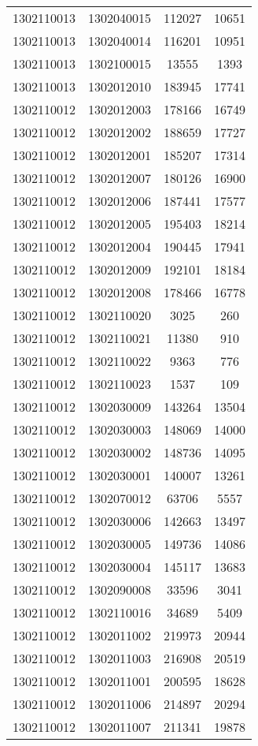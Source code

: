 \begin{longtable}{llcc}
1302110013 & 1302040015 & 112027 & 10651\\
1302110013 & 1302040014 & 116201 & 10951\\
1302110013 & 1302100015 & 13555 & 1393\\
1302110013 & 1302012010 & 183945 & 17741\\
1302110012 & 1302012003 & 178166 & 16749\\
1302110012 & 1302012002 & 188659 & 17727\\
1302110012 & 1302012001 & 185207 & 17314\\
1302110012 & 1302012007 & 180126 & 16900\\
1302110012 & 1302012006 & 187441 & 17577\\
1302110012 & 1302012005 & 195403 & 18214\\
1302110012 & 1302012004 & 190445 & 17941\\
1302110012 & 1302012009 & 192101 & 18184\\
1302110012 & 1302012008 & 178466 & 16778\\
1302110012 & 1302110020 & 3025 & 260\\
1302110012 & 1302110021 & 11380 & 910\\
1302110012 & 1302110022 & 9363 & 776\\
1302110012 & 1302110023 & 1537 & 109\\
1302110012 & 1302030009 & 143264 & 13504\\
1302110012 & 1302030003 & 148069 & 14000\\
1302110012 & 1302030002 & 148736 & 14095\\
1302110012 & 1302030001 & 140007 & 13261\\
1302110012 & 1302070012 & 63706 & 5557\\
1302110012 & 1302030006 & 142663 & 13497\\
1302110012 & 1302030005 & 149736 & 14086\\
1302110012 & 1302030004 & 145117 & 13683\\
1302110012 & 1302090008 & 33596 & 3041\\
1302110012 & 1302110016 & 34689 & 5409\\
1302110012 & 1302011002 & 219973 & 20944\\
1302110012 & 1302011003 & 216908 & 20519\\
1302110012 & 1302011001 & 200595 & 18628\\
1302110012 & 1302011006 & 214897 & 20294\\
1302110012 & 1302011007 & 211341 & 19878\\

\end{longtable}
